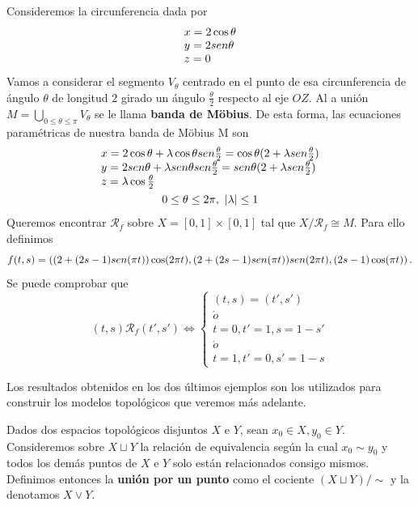 \documentclass[GTS.tex]{subfiles}
\begin{document}
\begin{ej}
Consideremos la circunferencia dada por
\begin{gather*}
\begin{array}{l}
x=2\cos\theta\\
y=2sen \theta\\
z=0
\end{array}
\end{gather*}
Vamos a considerar el segmento $V_\theta$  centrado en el punto de esa circunferencia de ángulo $\theta$ de longitud $2$ girado un ángulo $\frac{\theta}{2}$ respecto al eje $OZ$. Al a unión $M=\underset{0\leq\theta\leq\pi}{\bigcup}V_\theta$ se le llama \textbf{banda de Möbius}. De esta forma, las ecuaciones paramétricas de nuestra banda de Möbius M son
\begin{gather*}
\begin{array}{l}
x=2\cos\theta +\lambda \cos\theta sen \frac{\theta}{2}=\cos\theta(2+\lambda sen \frac{\theta}{2})\\
y=2sen \theta +\lambda sen \theta sen \frac{\theta}{2}=sen \theta(2+\lambda sen \frac{\theta}{2})\\
z=\lambda \cos\frac{\theta}{2}\\
\end{array}\\
0\leq\theta\leq 2\pi,\ |\lambda|\leq 1
\end{gather*}
Queremos encontrar $\mathcal{R}_f$ sobre $X=[0,1]\times[0,1]$ tal que $X/\mathcal{R}_f\cong M$. Para ello definimos
\[
f(t,s)=\left((2+(2s-1)sen(\pi t))\cos(2\pi t),(2+(2s-1)sen (\pi t))sen (2\pi t),(2s-1)\cos(\pi t) \right).
\]
Se puede comprobar que
\[
(t,s)\mathcal{R}_f (t',s')\Leftrightarrow\begin{cases}
(t,s)=(t',s')\\
\acute{o}\\
t=0,t'=1, s=1-s'\\
\acute{o}\\
t=1,t'=0,s'=1-s
\end{cases}
\]
\end{ej}

\vspace{0.2cm}

\begin{nota} Los resultados obtenidos en los dos últimos ejemplos son los utilizados para construir los modelos topológicos que veremos más adelante.
\end{nota}

\begin{defi}
Dados dos espacios topológicos disjuntos $X$ e $Y$, sean $x_0\in X, y_0\in Y$. Consideremos sobre $X\sqcup Y$ la relación de equivalencia según la cual $x_0\sim y_0$ y todos los demás puntos de $X$ e $Y$ solo están relacionados consigo mismos. Definimos entonces la \textbf{unión por un punto} como el cociente $(X\sqcup Y)/\sim$ y la denotamos $X\vee Y$.
\end{defi}
\end{document}
